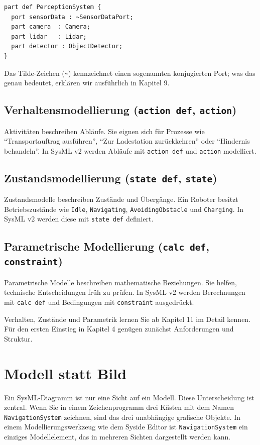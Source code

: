 \begin{lstlisting}
part def PerceptionSystem {
  port sensorData : ~SensorDataPort;
  part camera  : Camera;
  part lidar   : Lidar;
  part detector : ObjectDetector;
}
\end{lstlisting}

\begin{hinweisbox}
Das Tilde-Zeichen (\texttt{\textasciitilde}) kennzeichnet einen sogenannten konjugierten Port; was das genau bedeutet, erklären wir ausführlich in Kapitel 9.
\end{hinweisbox}

\subsection{Verhaltensmodellierung (\texttt{action def}, \texttt{action})}
Aktivitäten beschreiben Abläufe. Sie eignen sich für Prozesse wie \enquote{Transportauftrag ausführen}, \enquote{Zur Ladestation zurückkehren} oder \enquote{Hindernis behandeln}. In SysML v2 werden Abläufe mit \texttt{action def} und \texttt{action} modelliert.

\subsection{Zustandsmodellierung (\texttt{state def}, \texttt{state})}
Zustandsmodelle beschreiben Zustände und Übergänge. Ein Roboter besitzt Betriebszustände wie \texttt{Idle}, \texttt{Navigating}, \texttt{AvoidingObstacle} und \texttt{Charging}. In SysML v2 werden diese mit \texttt{state def} definiert.

\subsection{Parametrische Modellierung (\texttt{calc def}, \texttt{constraint})}
Parametrische Modelle beschreiben mathematische Beziehungen. Sie helfen, technische Entscheidungen früh zu prüfen. In SysML v2 werden Berechnungen mit \texttt{calc def} und Bedingungen mit \texttt{constraint} ausgedrückt.

Verhalten, Zustände und Parametrik lernen Sie ab Kapitel 11 im Detail kennen. Für den ersten Einstieg in Kapitel 4 genügen zunächst Anforderungen und Struktur.

\section{Modell statt Bild}
Ein SysML-Diagramm ist nur eine Sicht auf ein Modell. Diese Unterscheidung ist zentral. Wenn Sie in einem Zeichenprogramm drei Kästen mit dem Namen \texttt{NavigationSystem} zeichnen, sind das drei unabhängige grafische Objekte. In einem Modellierungswerkzeug wie dem Syside Editor ist \texttt{NavigationSystem} ein einziges Modellelement, das in mehreren Sichten dargestellt werden kann.

